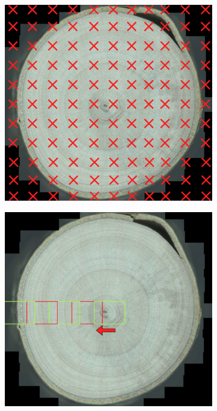 \documentclass[a4paper,12pt]{article}
\begin{document}
\begin{figure}
  \centering
  \begin{subfigure}{.3\textwidth}
      \centering
      \includegraphics[width=.95\linewidth]{../content/cookie_figure_grid.png}  
      \caption{}
      \label{SUBFIGURE LABEL 1}
  \end{subfigure}
  \begin{subfigure}{.3\textwidth}
      \centering
      \includegraphics[width=.95\linewidth]{../content/cookie_figure_traverse_start.png}  

\end{subfigure}
\end{figure}
\end{document}
